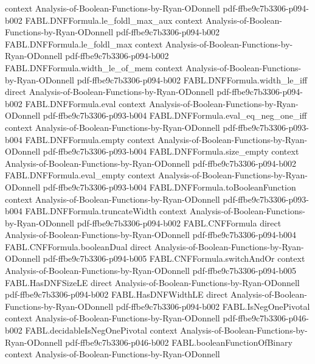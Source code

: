 \begin{theorem}
  {context}
  {Analysis-of-Boolean-Functions-by-Ryan-ODonnell}
  {pdf-ffbe9c7b3306-p094-b002}
\proofstep
  {FABL.DNFFormula.le_foldl_max_aux}
  {context}
  {Analysis-of-Boolean-Functions-by-Ryan-ODonnell}
  {pdf-ffbe9c7b3306-p094-b002}
\proofstep
  {FABL.DNFFormula.le_foldl_max}
  {context}
  {Analysis-of-Boolean-Functions-by-Ryan-ODonnell}
  {pdf-ffbe9c7b3306-p094-b002}
\proofstep
  {FABL.DNFFormula.width_le_of_mem}
  {context}
  {Analysis-of-Boolean-Functions-by-Ryan-ODonnell}
  {pdf-ffbe9c7b3306-p094-b002}
\proofstep
  {FABL.DNFFormula.width_le_iff}
  {direct}
  {Analysis-of-Boolean-Functions-by-Ryan-ODonnell}
  {pdf-ffbe9c7b3306-p094-b002}
\proofstep
  {FABL.DNFFormula.eval}
  {context}
  {Analysis-of-Boolean-Functions-by-Ryan-ODonnell}
  {pdf-ffbe9c7b3306-p093-b004}
\proofstep
  {FABL.DNFFormula.eval_eq_neg_one_iff}
  {context}
  {Analysis-of-Boolean-Functions-by-Ryan-ODonnell}
  {pdf-ffbe9c7b3306-p093-b004}
\proofstep
  {FABL.DNFFormula.empty}
  {context}
  {Analysis-of-Boolean-Functions-by-Ryan-ODonnell}
  {pdf-ffbe9c7b3306-p093-b004}
\proofstep
  {FABL.DNFFormula.size_empty}
  {context}
  {Analysis-of-Boolean-Functions-by-Ryan-ODonnell}
  {pdf-ffbe9c7b3306-p094-b002}
\proofstep
  {FABL.DNFFormula.eval_empty}
  {context}
  {Analysis-of-Boolean-Functions-by-Ryan-ODonnell}
  {pdf-ffbe9c7b3306-p093-b004}
\proofstep
  {FABL.DNFFormula.toBooleanFunction}
  {context}
  {Analysis-of-Boolean-Functions-by-Ryan-ODonnell}
  {pdf-ffbe9c7b3306-p093-b004}
\proofstep
  {FABL.DNFFormula.truncateWidth}
  {context}
  {Analysis-of-Boolean-Functions-by-Ryan-ODonnell}
  {pdf-ffbe9c7b3306-p094-b002}
\proofstep
  {FABL.CNFFormula}
  {direct}
  {Analysis-of-Boolean-Functions-by-Ryan-ODonnell}
  {pdf-ffbe9c7b3306-p094-b004}
\proofstep
  {FABL.CNFFormula.booleanDual}
  {direct}
  {Analysis-of-Boolean-Functions-by-Ryan-ODonnell}
  {pdf-ffbe9c7b3306-p094-b005}
\proofstep
  {FABL.CNFFormula.switchAndOr}
  {context}
  {Analysis-of-Boolean-Functions-by-Ryan-ODonnell}
  {pdf-ffbe9c7b3306-p094-b005}
\proofstep
  {FABL.HasDNFSizeLE}
  {direct}
  {Analysis-of-Boolean-Functions-by-Ryan-ODonnell}
  {pdf-ffbe9c7b3306-p094-b002}
\proofstep
  {FABL.HasDNFWidthLE}
  {direct}
  {Analysis-of-Boolean-Functions-by-Ryan-ODonnell}
  {pdf-ffbe9c7b3306-p094-b002}
\proofstep
  {FABL.IsNegOnePivotal}
  {context}
  {Analysis-of-Boolean-Functions-by-Ryan-ODonnell}
  {pdf-ffbe9c7b3306-p046-b002}
\proofstep
  {FABL.decidableIsNegOnePivotal}
  {context}
  {Analysis-of-Boolean-Functions-by-Ryan-ODonnell}
  {pdf-ffbe9c7b3306-p046-b002}
\proofstep
  {FABL.booleanFunctionOfBinary}
  {context}
  {Analysis-of-Boolean-Functions-by-Ryan-ODonnell}

\end{theorem}
